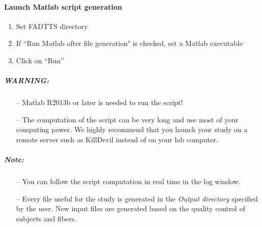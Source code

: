 \documentclass[fadttsterUserGuide_use]{subfiles}
\begin{document}
	\paragraph{Launch Matlab script generation}
	\begin{enumerate}
		\item Set FADTTS directory		
		\item If ``Run Matlab after file generation" is checked, set a Matlab executable
		\item Click on ``Run''
	\end{enumerate}
	\subparagraph{\textbf{WARNING:}}
	\begin{itemize}
		\item[--] Matlab R2013b or later is needed to run the script!
		\item[--] The computation of the script can be very long and use most of your computing power. We highly recommend that you launch your study on a remote server such as KillDevil instead of on your lab computer.
	\end{itemize}
	\subparagraph{\textbf{Note:}}
	\begin{itemize}
		\item[--] You can follow the script computation in real time in the log window.
		\item[--] Every file useful for the study is generated in the \textit{Output directory} specified by the user. New input files are generated based on the quality control of subjects and fibers.
	\end{itemize}
	\vfill
	\newpage
	
\end{document}

